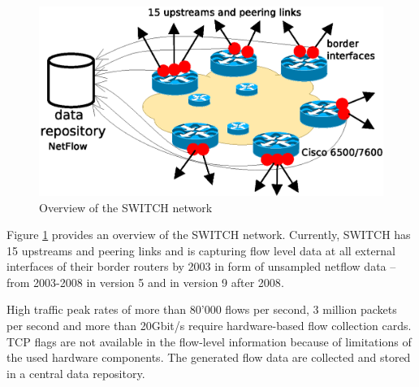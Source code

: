 \begin{figure}[b] 
	\centering
	\includegraphics[width=12cm]{images/network_overview.eps}
	\caption{Overview of the SWITCH network \citep{SchatzmanThesis2012}} 
	\label{fig:switch_nework}
\end{figure}

Figure \ref{fig:switch_nework} provides an overview of the SWITCH network. 
Currently, SWITCH has 15 upstreams and peering links and is capturing flow level 
data at all external interfaces of their border routers by 2003 in form of 
unsampled \gls{netflow} data -- from 2003-2008 in version 5 and in version 9 
after 2008\citep{Schatzmann:Tracing}.

High traffic peak rates of more than 80'000 flows per second, 3 million packets 
per second and more than 20Gbit/s require hardware-based flow collection 
cards\citep{Schatzmann:Tracing}. \gls{TCP} flags are not available in the 
flow-level information because of limitations of the used hardware 
components\citep{Schatzmann:Tracing}. The generated flow data are collected and 
stored in a central data repository.

